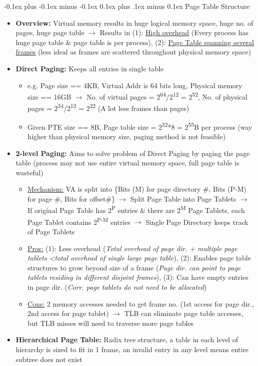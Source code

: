\documentclass[landscape]{article}
\makeatletter
\renewcommand{\subsection}{\@startsection{subsection}{2}{0mm}%
  {-0.1ex plus -0.1ex minus -0.1ex}%
  {0.1ex plus .1ex minus 0.1ex}%
{\normalfont\scriptsize\bfseries}}
\makeatother
\begin{document}
\begin{multicols*}{6}
    \subsection{Page Table Structure}
    \begin{itemize}
      \item \textbf{Overview:} Virtual memory results in huge logical memory space, huge no. of pages, huge page table $\rightarrow$ Results in (1): \underline{High overhead} (Every process has huge page table \& page table is per process), (2): \underline{Page Table spanning several frames} (less ideal as frames are scattered throughout physical memory space)
      \item \textbf{Direct Paging:} Keeps all entries in single table
      \begin{itemize}
        \item e.g. Page size == 4KB, Virtual Addr is 64 bits long, Physical memory size == 16GB $\rightarrow$ No. of virtual pages = 2\textsuperscript{64}/2\textsuperscript{12} = 2\textsuperscript{52}, No. of physical pages = 2\textsuperscript{34}/2\textsuperscript{12} = 2\textsuperscript{22} (A lot less frames than pages)
        \item Given PTE size == 8B, Page table size = 2\textsuperscript{52}*8 = 2\textsuperscript{55}B per process (way higher than physical memory size, paging method is not feasible)
      \end{itemize}
      \item \textbf{2-level Paging:} Aims to solve problem of Direct Paging by paging the page table (process may not use entire virtual memory space, full page table is wasteful)
      \begin{itemize}
        \item \underline{Mechanism:} VA is split into \{Bits (M) for page directory \#, Bits (P-M) for page \#, Bits for offset\#\} $\rightarrow$ Split Page Table into Page Tablets $\rightarrow$ If original Page Table has 2\textsuperscript{P} entries \& there are 2\textsuperscript{M} Page Tablets, each Page Tablet contains 2\textsuperscript{P-M} entries $\rightarrow$ Single Page Directory keeps track of Page Tablets
        \item \underline{Pros:} (1): Less overhead (\textit{Total overhead of page dir. + multiple page tablets \textless total overhead of single large page table}), (2): Enables page table structures to grow beyond size of a frame (\textit{Page dir. can point to page tablets residing in different disjoint frames}), (3): Can have empty entries in page dir. (\textit{Corr. page tablets do not need to be allocated})
        \item \underline{Cons:} 2 memory accesses needed to get frame no. (1st access for page dir., 2nd access for page tablet) $\rightarrow$ TLB can eliminate page table accesses, but TLB misses will need to traverse more page tables
      \end{itemize}
      \item \textbf{Hierarchical Page Table:} Radix tree structure, a table in each level of hierarchy is sized to fit in 1 frame, an invalid entry in any level means entire subtree does not exist
    \end{itemize}


\end{multicols*}
\end{document}
